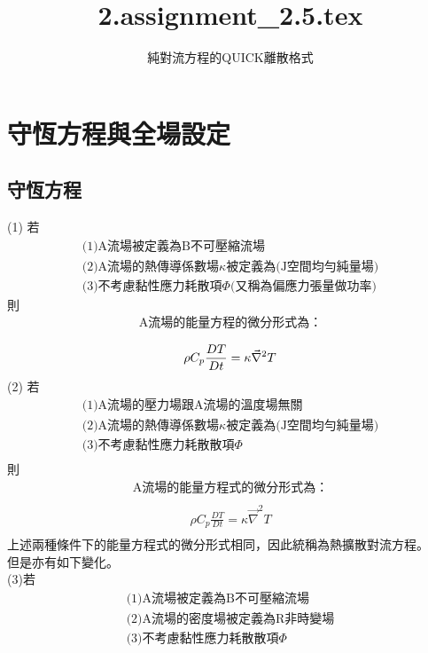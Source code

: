 \documentclass[12pt]{article}
\title{2.assignment\_2.5.tex}
\author{純對流方程的QUICK離散格式}
\begin{document}
\maketitle
\section{守恆方程與全場設定}
\subsection{守恆方程}
(1)
若
\[\begin{array}{l}
    \text{(1)A流場被定義為B不可壓縮流場}\\[1.5ex]
    \text{(2)A流場的熱傳導係數場$\kappa$被定義為(J空間均勻純量場)}\\[1.5ex]
    \text{(3)不考慮黏性應力耗散項$\varPhi$(又稱為偏應力張量做功率)}
\end{array}\]
則
\[\begin{array}{l}
    \text{A流場的能量方程的微分形式為：}\\[1.5ex]
\end{array}\]
\begin{equation}
    \rho C_p \frac{DT}{Dt} = \kappa \vec{\nabla}^2 T \\
\end{equation}
(2)
若
\[\begin{array}{l}
    \text{(1)A流場的壓力場跟A流場的溫度場無關}\\[1.5ex]
    \text{(2)A流場的熱傳導係數場$\kappa$被定義為(J空間均勻純量場)}\\[1.5ex]
    \text{(3)不考慮黏性應力耗散散項$\varPhi$}\\[1.5ex]
\end{array}\]
則
\[\begin{array}{l}
    \text{A流場的能量方程式的微分形式為：}\\[1.5ex]
\end{array}
\]
\begin{equation}\begin{split}
        \rho C_p \frac{DT}{Dt} = \kappa \vec{\nabla}^2 T \\
\end{split}
\end{equation}
上述兩種條件下的能量方程式的微分形式相同，因此統稱為熱擴散對流方程。\\
但是亦有如下變化。\\
(3)若
\[\begin{array}{l}
    \text{(1)A流場被定義為B不可壓縮流場}\\[1.5ex]
    \text{(2)A流場的密度場被定義為R非時變場}\\[1.5ex]
    \text{(3)不考慮黏性應力耗散散項$\varPhi$}\\[1.5ex]
\end{array}\]
\end{document}
